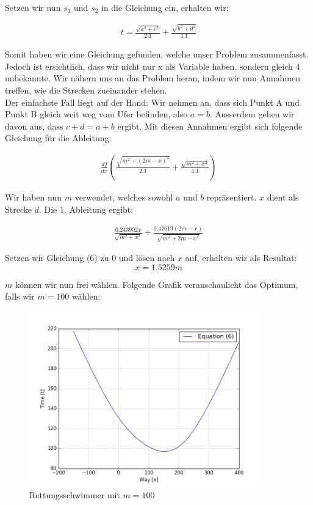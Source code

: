 \documentclass[10pt]{article}         %
\begin{document}
Setzen wir nun $s_1$ und $s_2$ in die Gleichung ein, erhalten wir:

\begin{align}
    t = \frac{\sqrt{a^2+c^2}}{2.1} + \frac{\sqrt{b^2+d^2}}{4.1}
\end{align}

Somit haben wir eine Gleichung gefunden, welche unser Problem zusammenfasst. Jedoch ist ersichtlich, dass wir nicht nur x als Variable haben, sondern gleich 4 unbekannte. Wir nähern uns an das Problem heran, indem wir nun Annahmen treffen, wie die Strecken zueinander stehen. \\
Der einfachste Fall liegt auf der Hand: Wir nehmen an, dass sich Punkt A und Punkt B gleich weit weg vom Ufer befinden, also $a=b$. Ausserdem gehen wir davon aus, dass $c+d=a+b$ ergibt. Mit diesen Annahmen ergibt sich folgende Gleichung für die Ableitung:

\begin{align}
    \frac{df}{dx}(\frac{\sqrt{m^2+{(2m-x)}^2}}{2.1} + \frac{\sqrt{m^2+x^2}}{4.1})
\end{align}

Wir haben nun $m$ verwendet, welches sowohl $a$ und $b$ repräsentiert. $x$ dient als Strecke $d$. Die 1. Ableitung ergibt:

\begin{align}
    \frac{0.243902x}{\sqrt{m^2+x^2}}+\frac{0.47619(2m-x)}{\sqrt{m^2+{2m-x}^2}}
\end{align}

Setzen wir Gleichung (6) zu 0 und lösen nach $x$ auf, erhalten wir als Resultat:
\[
    x = 1.5259m
\]

$m$ können wir nun frei wählen. Folgende Grafik veranschaulicht das Optimum, falls wir $m=100$ wählen:

\pagebreak
\begin{figure}[!ht]
    \centering
    \includegraphics[width=0.9\textwidth]{lifeguard_100}
    \caption{Rettungsschwimmer mit $m=100$}\label{lifeguard_100}
\end{figure}
\end{document}
